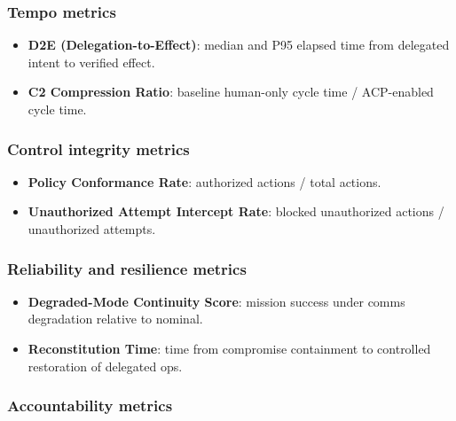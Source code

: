\documentclass[
]{article}
\providecommand{\tightlist}{%
  \setlength{\itemsep}{0pt}\setlength{\parskip}{0pt}}
\begin{document}
\hypertarget{tempo-metrics}{%
\subsubsection{Tempo metrics}\label{tempo-metrics}}

\begin{itemize}
\tightlist
\item
  \textbf{D2E (Delegation-to-Effect)}: median and P95 elapsed time from
  delegated intent to verified effect.
\item
  \textbf{C2 Compression Ratio}: baseline human-only cycle time /
  ACP-enabled cycle time.
\end{itemize}

\hypertarget{control-integrity-metrics}{%
\subsubsection{Control integrity
metrics}\label{control-integrity-metrics}}

\begin{itemize}
\tightlist
\item
  \textbf{Policy Conformance Rate}: authorized actions / total actions.
\item
  \textbf{Unauthorized Attempt Intercept Rate}: blocked unauthorized
  actions / unauthorized attempts.
\end{itemize}

\hypertarget{reliability-and-resilience-metrics}{%
\subsubsection{Reliability and resilience
metrics}\label{reliability-and-resilience-metrics}}

\begin{itemize}
\tightlist
\item
  \textbf{Degraded-Mode Continuity Score}: mission success under comms
  degradation relative to nominal.
\item
  \textbf{Reconstitution Time}: time from compromise containment to
  controlled restoration of delegated ops.
\end{itemize}

\hypertarget{accountability-metrics}{%
\subsubsection{Accountability metrics}\label{accountability-metrics}}
\end{document}
